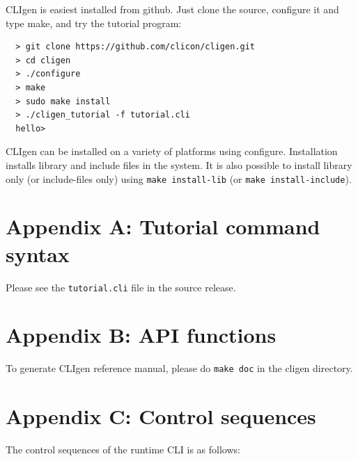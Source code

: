 \documentclass[a4paper, 10pt] {article}
\begin{document}
CLIgen is easiest installed from github. Just clone the source,
configure it and type make, and try the tutorial program:

\begin{verbatim}
  > git clone https://github.com/clicon/cligen.git
  > cd cligen
  > ./configure
  > make
  > sudo make install
  > ./cligen_tutorial -f tutorial.cli
  hello>
\end{verbatim}

CLIgen can be installed on a variety of platforms using
configure. Installation installs library and include files in the
system. It is also possible to install library only (or include-files
only) using {\tt make install-lib} (or {\tt make install-include}).

\normalsize

\newpage
\section*{Appendix A: Tutorial command syntax}
\label{app:syntax}

Please see the {\tt tutorial.cli} file in the source release.


\newpage
\section*{Appendix B: API functions}
\label{app:functions}

To generate CLIgen reference manual, please do {\tt make doc} in the cligen directory.

\newpage
\section*{Appendix C: Control sequences}
\label{app:control}
The control sequences of the runtime CLI is as follows:
\end{document}
